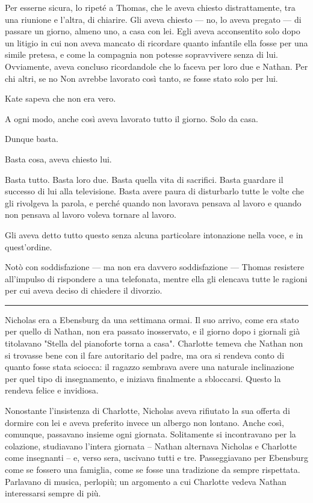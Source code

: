 \documentclass[a4paper,oneside,11pt]{memoir}
\begin{document}
Per esserne sicura, lo ripeté a Thomas, che le aveva chiesto distrattamente, tra una riunione e
l'altra, di chiarire. Gli aveva chiesto — no, lo aveva pregato — di passare un giorno, almeno uno, a
casa con lei. Egli aveva acconsentito solo dopo un litigio in cui non aveva mancato di ricordare
quanto infantile ella fosse per una simile pretesa, e come la compagnia non potesse sopravvivere
senza di lui. Ovviamente, aveva concluso ricordandole che lo faceva per loro due e Nathan. Per chi
altri, se no Non avrebbe lavorato così tanto, se fosse stato solo per lui.

Kate sapeva che non era vero.

A ogni modo, anche così aveva lavorato tutto il giorno. Solo da casa.

Dunque basta.

Basta cosa, aveva chiesto lui.

Basta tutto. Basta loro due. Basta quella vita di sacrifici. Basta guardare il successo di lui alla
televisione. Basta avere paura di disturbarlo tutte le volte che gli rivolgeva la parola, e perché
quando non lavorava pensava al lavoro e quando non pensava al lavoro voleva tornare al lavoro.

Gli aveva detto tutto questo senza alcuna particolare intonazione nella voce, e in quest'ordine.

Notò con soddisfazione — ma non era davvero soddisfazione — Thomas resistere all'impulso di
rispondere a una telefonata, mentre ella gli elencava tutte le ragioni per cui aveva deciso di
chiedere il divorzio.

\plainbreak{1}

Nicholas era a Ebensburg da una settimana ormai. Il suo arrivo, come era stato per quello di
Nathan, non era passato inosservato, e il giorno dopo i giornali già titolavano "Stella del
pianoforte torna a casa". Charlotte temeva che Nathan non si trovasse bene con il fare autoritario
del padre, ma ora si rendeva conto di quanto fosse stata sciocca: il ragazzo sembrava avere una
naturale inclinazione per quel tipo di insegnamento, e iniziava finalmente a sbloccarsi. Questo la
rendeva felice e invidiosa.

Nonostante l'insistenza di Charlotte, Nicholas aveva rifiutato la sua offerta di dormire con lei e
aveva preferito invece un albergo non lontano. Anche così, comunque, passavano insieme ogni
giornata. Solitamente si incontravano per la colazione, studiavano l'intera giornata -- Nathan
alternava Nicholas e Charlotte come insegnanti -- e, verso sera, uscivano tutti e tre. Passeggiavano
per Ebensburg come se fossero una famiglia, come se fosse una tradizione da sempre rispettata.
Parlavano di musica, perlopiù; un argomento a cui Charlotte vedeva Nathan interessarsi sempre di
più.
\end{document}
